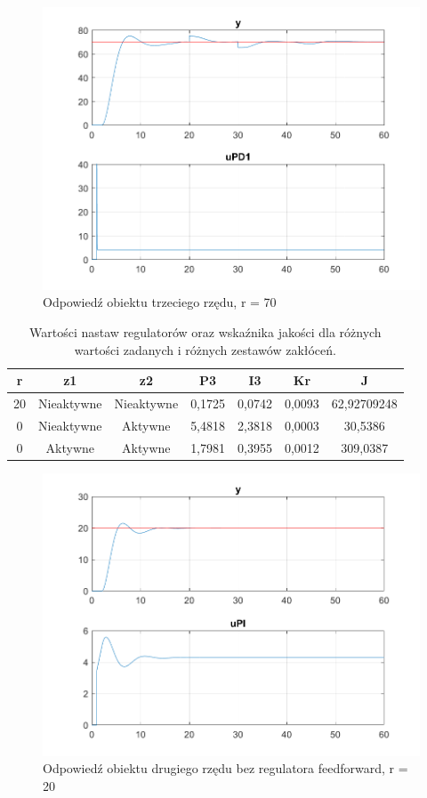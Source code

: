 \begin{figure}[h!]
	\centering
	\includegraphics[scale = 0.8]{fig/Z1_New_Signal_1/fig1_3_70.png}
	\caption		
	{Odpowiedź obiektu trzeciego rzędu, r = 70}
	\label{wykres_4}
\end{figure}

\begin{table}[h!]
	\centering
	\caption{Wartości nastaw regulatorów oraz wska\'znika jakości dla różnych wartości zadanych i różnych zestawów zakłóceń.}
	\label{bez_feedforward_tab}
	\begin{tabular}{|c|c|c|c|c|c|c|}
		\hline
		r & z1 & z2& P3 & I3 & Kr & J \\ \hline
		20 & Nieaktywne & Nieaktywne & 0,1725 & 0,0742 & 0,0093 & 62,92709248 \\ \hline
		0 & Nieaktywne & Aktywne & 5,4818 & 2,3818 & 0,0003 & 30,5386 \\ \hline
		0 & Aktywne & Aktywne & 1,7981 & 0,3955 & 0,0012 & 309,0387 \\ \hline
	\end{tabular}
\end{table}

\begin{figure}[h!]
	\centering
	\includegraphics[scale = 0.8]{fig/bezFeedforward/fig1_2_20_bezZaklocen.png}
	\caption		
	{Odpowiedź obiektu drugiego rzędu bez regulatora feedforward, r = 20}
	\label{wykres_5}
\end{figure} 

